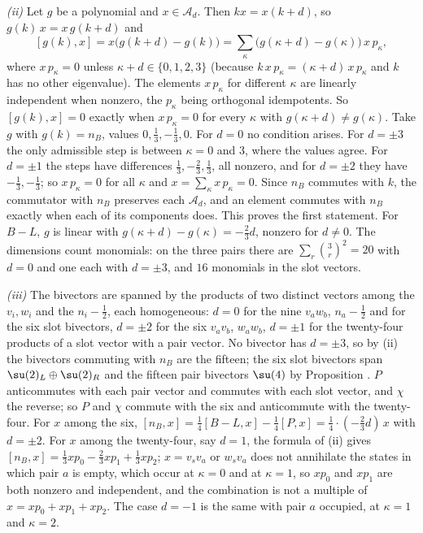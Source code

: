 \emph{(ii)} Let $g$ be a polynomial and $x \in \mathcal{A}_{d}$. Then $kx = x(k + d)$, so $g(k)\,x = x\,g(k + d)$ and
\[
[g(k), x] = x\bigl(g(k + d) - g(k)\bigr) = \sum_{\kappa}\bigl(g(\kappa + d) - g(\kappa)\bigr)\,x\,p_{\kappa},
\]
where $x\,p_{\kappa} = 0$ unless $\kappa + d \in \{0, 1, 2, 3\}$ (because $k\,x\,p_{\kappa} = (\kappa + d)\,x\,p_{\kappa}$ and $k$ has no other eigenvalue). The elements $x\,p_{\kappa}$ for different $\kappa$ are linearly independent when nonzero, the $p_{\kappa}$ being orthogonal idempotents. So $[g(k), x] = 0$ exactly when $x\,p_{\kappa} = 0$ for every $\kappa$ with $g(\kappa + d) \ne g(\kappa)$. Take $g$ with $g(k) = n_{B}$, values $0, \tfrac13, -\tfrac13, 0$. For $d = 0$ no condition arises. For $d = \pm 3$ the only admissible step is between $\kappa = 0$ and $3$, where the values agree. For $d = \pm 1$ the steps have differences $\tfrac13, -\tfrac23, \tfrac13$, all nonzero, and for $d = \pm 2$ they have $-\tfrac13, -\tfrac13$; so $x\,p_{\kappa} = 0$ for all $\kappa$ and $x = \sum_{\kappa}x\,p_{\kappa} = 0$. Since $n_{B}$ commutes with $k$, the commutator with $n_{B}$ preserves each $\mathcal{A}_{d}$, and an element commutes with $n_{B}$ exactly when each of its components does. This proves the first statement. For $B - L$, $g$ is linear with $g(\kappa + d) - g(\kappa) = -\tfrac23 d$, nonzero for $d \ne 0$. The dimensions count monomials: on the three pairs there are $\sum_{r}\binom{3}{r}^{2} = 20$ with $d = 0$ and one each with $d = \pm 3$, and $16$ monomials in the slot vectors.

\emph{(iii)} The bivectors are spanned by the products of two distinct vectors among the $v_{i}, w_{i}$ and the $n_{i} - \tfrac12$, each homogeneous: $d = 0$ for the nine $v_{a}w_{b}$, $n_{a} - \tfrac12$ and for the six slot bivectors, $d = \pm 2$ for the six $v_{a}v_{b}$, $w_{a}w_{b}$, $d = \pm 1$ for the twenty-four products of a slot vector with a pair vector. No bivector has $d = \pm 3$, so by (ii) the bivectors commuting with $n_{B}$ are the fifteen; the six slot bivectors span $\su(2)_{L} \oplus \su(2)_{R}$ and the fifteen pair bivectors $\su(4)$ by Proposition . $P$ anticommutes with each pair vector and commutes with each slot vector, and $\chi$ the reverse; so $P$ and $\chi$ commute with the six and anticommute with the twenty-four. For $x$ among the six, $[n_{B}, x] = \tfrac14[B - L, x] - \tfrac14[P, x] = \tfrac14 \cdot (-\tfrac23 d)\,x$ with $d = \pm 2$. For $x$ among the twenty-four, say $d = 1$, the formula of (ii) gives $[n_{B}, x] = \tfrac13 x p_{0} - \tfrac23 x p_{1} + \tfrac13 x p_{2}$; $x = v_{s}v_{a}$ or $w_{s}v_{a}$ does not annihilate the states in which pair $a$ is empty, which occur at $\kappa = 0$ and at $\kappa = 1$, so $x p_{0}$ and $x p_{1}$ are both nonzero and independent, and the combination is not a multiple of $x = x p_{0} + x p_{1} + x p_{2}$. The case $d = -1$ is the same with pair $a$ occupied, at $\kappa = 1$ and $\kappa = 2$.

